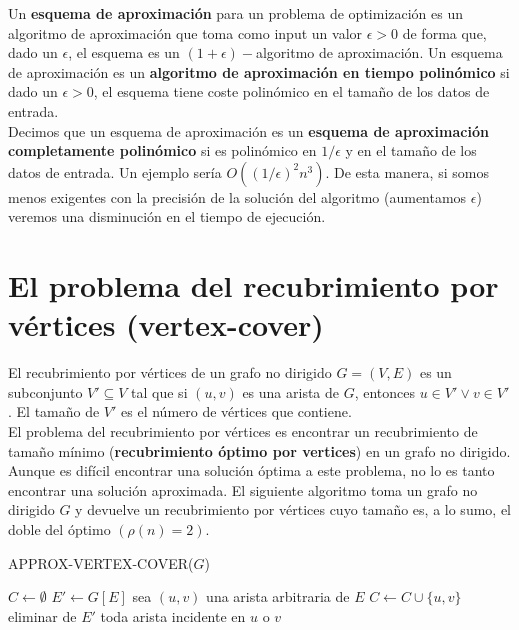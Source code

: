\documentclass{article}
\begin{document}
Un \textbf{esquema de aproximaci\'on} para un problema de optimizaci\'on es un algoritmo de aproximaci\'on que toma como input un valor $\epsilon > 0$ de forma que, dado un $\epsilon$, el esquema es un $(1 + \epsilon)-$algoritmo de aproximaci\'on. Un esquema de aproximaci\'on es un \textbf{algoritmo de aproximaci\'on en tiempo polin\'omico} si dado un $\epsilon > 0$, el esquema tiene coste polin\'omico en el tamaño de los datos de entrada.\\

Decimos que un esquema de aproximaci\'on es un \textbf{esquema de aproximaci\'on completamente polin\'omico} si es polin\'omico en $1/\epsilon$ y en el tamaño de los datos de entrada. Un ejemplo ser\'ia $O((1/\epsilon)^2n^3)$. De esta manera, si somos menos exigentes con la precisi\'on de la solución del algoritmo (aumentamos $\epsilon$) veremos una disminuci\'on en el tiempo de ejecuci\'on.

\section{El problema del recubrimiento por v\'ertices (vertex-cover)}\label{sec:vertexCover}
El recubrimiento por v\'ertices de un grafo no dirigido $G = (V,E)$ es un subconjunto $V' \subseteq V$ tal que si $(u, v)$ es una arista de $G$, entonces $ u \in V' \vee v \in V'$. El tamaño de $V'$ es el n\'umero de v\'ertices que contiene. \\

El problema del recubrimiento por v\'ertices es encontrar un recubrimiento de tamaño m\'inimo (\textbf{recubrimiento \'optimo por vertices}) en un grafo no dirigido. Aunque es dif\'icil encontrar una soluci\'on \'optima a este problema, no lo es tanto encontrar una soluci\'on aproximada. El siguiente algoritmo toma un grafo no dirigido $G$ y devuelve un recubrimiento por v\'ertices cuyo tamaño es, a lo sumo, el doble del \'optimo $(\rho(n) = 2)$.\\


\begin{algorithm}[H]
\caption{APPROX-VERTEX-COVER($G$)}
\begin{algorithmic}[1]
\STATE $C\gets \emptyset $
\STATE $E' \gets G[E]$
\STATE sea $(u,v)$ una arista arbitraria de $E$
\STATE $C \gets C \cup \{u,v\}$
\STATE eliminar de $E'$ toda arista incidente en $u$ o $v$
\ENDWHILE
{}
\end{algorithmic}
\end{algorithm}
\end{document}
